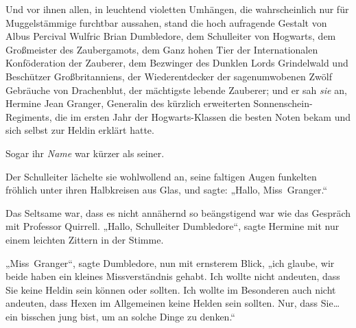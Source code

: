 Und vor ihnen allen, in leuchtend violetten Umhängen, die wahrscheinlich nur für Muggelstämmige furchtbar aussahen, stand die hoch aufragende Gestalt von Albus Percival Wulfric Brian Dumbledore, dem Schulleiter von Hogwarts, dem Großmeister des Zaubergamots, dem Ganz hohen Tier der Internationalen Konföderation der Zauberer, dem Bezwinger des Dunklen Lords Grindelwald und Beschützer Großbritanniens, der Wiederentdecker der sagenumwobenen Zwölf Gebräuche von Drachenblut, der mächtigste lebende Zauberer; und er sah \emph{sie} an, Hermine Jean Granger, Generalin des kürzlich erweiterten Sonnenschein-Regiments, die im ersten Jahr der Hogwarts-Klassen die besten Noten bekam und sich selbst zur Heldin erklärt hatte.

Sogar ihr \emph{Name} war kürzer als seiner.

Der Schulleiter lächelte sie wohlwollend an, seine faltigen Augen funkelten fröhlich unter ihren Halbkreisen aus Glas, und sagte: „Hallo, Miss~Granger.“

Das Seltsame war, dass es nicht annähernd so beängstigend war wie das Gespräch mit Professor Quirrell. „Hallo, Schulleiter Dumbledore“, sagte Hermine mit nur einem leichten Zittern in der Stimme.

„Miss~Granger“, sagte Dumbledore, nun mit ernsterem Blick, „ich glaube, wir beide haben ein kleines Missverständnis gehabt. Ich wollte nicht andeuten, dass Sie keine Heldin sein können oder sollten. Ich wollte im Besonderen auch nicht andeuten, dass Hexen im Allgemeinen keine Helden sein sollten. Nur, dass Sie… ein bisschen jung bist, um an solche Dinge zu denken.“


